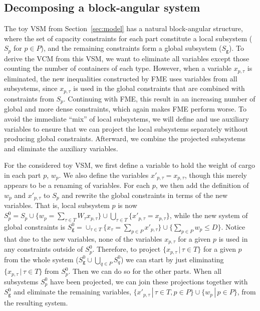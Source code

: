 \documentclass{llncs}
\newcommand{\trt}[1]{\texttt{#1}}
\newcommand{\set}[2]{\{{#1}\,|\,{#2}\}}
\begin{document}
\subsection{Decomposing a block-angular system}\label{sec:decomp}
The toy VSM from Section~\ref{sec:model} has a natural block-angular structure, where the set of capacity constraints for each part constitute a local subsystem ($S_p$ for $p\in P$), and the remaining constraints form a global subsystem ($S_\texttt{g}$). 
To derive the VCM from this VSM, we want to eliminate all variables except those counting the number of containers of each type. However, when a variable $x_{p,\tau}$ is eliminated, the new inequalities constructed by FME uses variables from all subsystems, since $x_{p,\tau}$ is used in the global constraints that are combined with constraints from $S_p$. Continuing with FME, this result in an increasing number of global and more dense constraints, which again makes FME perform worse. 
To avoid the immediate ``mix'' of local subsystems, we will define and use auxiliary variables to ensure that we can project the local subsystems separately without producing global constraints. Afterward, we combine the projected subsystems and eliminate the auxiliary variables. 

For the considered toy VSM, we first define a variable to hold the weight of cargo in each part $p$, $w_p$. We also define the variables $x'_{p,\tau} = x_{p,\tau}$, though this merely appears to be a renaming of variables. For each $p$, we then add the definition of $w_p$ and $x'_{p,\tau}$ to $S_p$ and rewrite the global constraints in terms of the new variables. 
That is, local subsystem $p$ is now $S_p^0 = S_p \cup \{w_p = \sum_{\tau\in T} W_\tau x_{p,\tau}\} \cup \bigcup_{\tau\in T}\{x'_{p,\tau} = x_{p,\tau}\}$, while the new system of global constraints is $S_\texttt{g}^0 = \cup_{\tau\in T}\{x_\tau = \sum_{p\in P} x'_{p,\tau}\} \cup \{\sum_{p\in P} w_p \leq D\}$. 
%
Notice that due to the new variables, none of the variables $x_{p,\tau}$ for a given $p$ is used in any constraints outside of $S^0_p$. Therefore, to project $\set{x_{p,\tau}}{\tau\in T}$ for a given $p$ from the whole system ($S^0_\texttt{g}\cup\bigcup_{q\in P}S^0_{q}$) we can start by just eliminating $\set{x_{p,\tau}}{\tau\in T}$ from $S_p^0$. Then we can do so for the other parts. When all subsystems $S^0_p$ have been projected, we can join these projections together with $S^0_\trt{g}$ and eliminate the remaining variables, $\set{x'_{p,\tau}}{\tau\in T, p\in P}\cup\set{w_p}{p\in P}$, from the resulting system.
\end{document}
